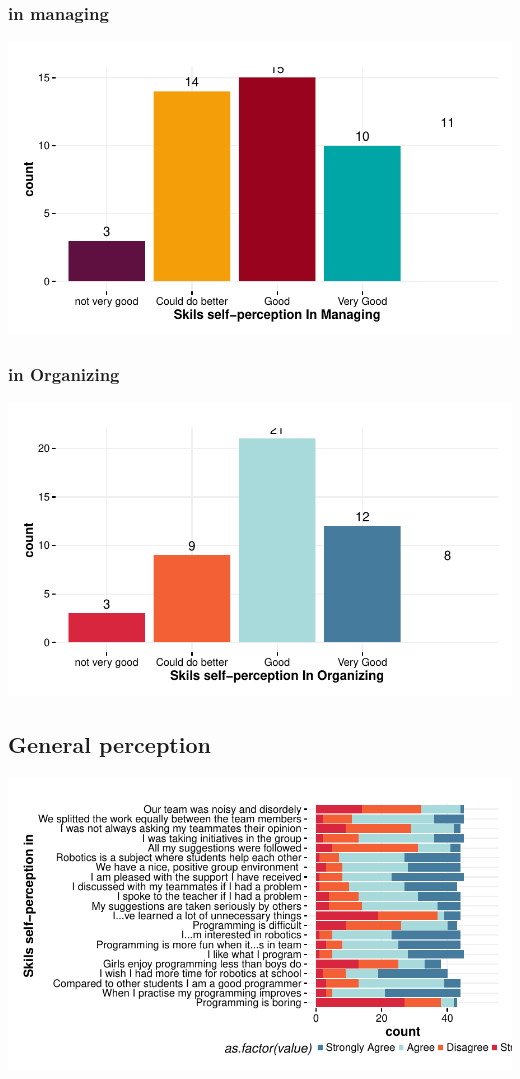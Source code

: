 \documentclass{article}
\begin{document}
\subsubsection{in managing}
\includegraphics{Raw_num/plots/-plot_skill_selfp_manag}

\subsubsection{in Organizing}
\includegraphics{Raw_num/plots/-plot_skill_selfp_organi}
\subsection{General perception}

\includegraphics{Raw_num/plots/-plot_generalPerception}
\end{document}
